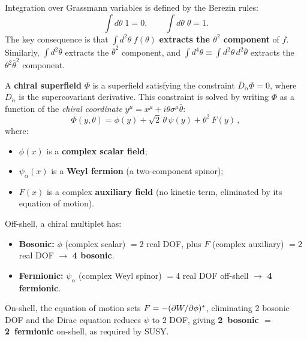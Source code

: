 \documentclass[11pt,a4paper]{article}
\begin{document}
\begin{definition}
\label{def:grassmann-int}
Integration over Grassmann variables is defined by the Berezin rules:
\begin{equation}
  \int d\theta\; 1 = 0, \qquad \int d\theta\; \theta = 1.
  \label{eq:berezin}
\end{equation}
The key consequence is that $\int d^2\theta\; f(\theta)$ \textbf{extracts
the $\theta^2$ component} of $f$.  Similarly,
$\int d^2\bar\theta$ extracts the $\bar\theta^2$ component, and
$\int d^4\theta \equiv \int d^2\theta\, d^2\bar\theta$ extracts the
$\theta^2\bar\theta^2$ component.
\end{definition}

\begin{definition}
\label{def:chiral-superfield}
A \textbf{chiral superfield} $\Phi$ is a superfield satisfying the
constraint $\bar{D}_{\dot\alpha} \Phi = 0$, where $\bar{D}_{\dot\alpha}$
is the supercovariant derivative.  This constraint is solved by writing
$\Phi$ as a function of the \emph{chiral coordinate}
$y^\mu = x^\mu + i\theta\sigma^\mu\bar\theta$:
\begin{equation}
  \boxed{
    \Phi(y, \theta)
    = \phi(y) + \sqrt{2}\,\theta\,\psi(y) + \theta^2\, F(y)\,,
  }
  \label{eq:chiral-expansion}
\end{equation}
where:
\begin{itemize}
  \item $\phi(x)$ is a \textbf{complex scalar field};
  \item $\psi_\alpha(x)$ is a \textbf{Weyl fermion} (a two-component
    spinor);
  \item $F(x)$ is a complex \textbf{auxiliary field} (no kinetic term,
    eliminated by its equation of motion).
\end{itemize}
\end{definition}

\begin{remark}
\label{rem:chiral-dof}
Off-shell, a chiral multiplet has:
\begin{itemize}
  \item \textbf{Bosonic:} $\phi$ (complex scalar) $= 2$ real DOF, plus
    $F$ (complex auxiliary) $= 2$ real DOF $\to$ \textbf{4 bosonic}.
  \item \textbf{Fermionic:} $\psi_\alpha$ (complex Weyl spinor) $= 4$ real
    DOF off-shell $\to$ \textbf{4 fermionic}.
\end{itemize}
On-shell, the equation of motion sets $F = -(\partial W / \partial \phi)^*$,
eliminating 2 bosonic DOF and the Dirac equation reduces $\psi$ to 2 DOF,
giving \textbf{2~bosonic $=$ 2~fermionic} on-shell, as required by SUSY.
\end{remark}
\end{document}
